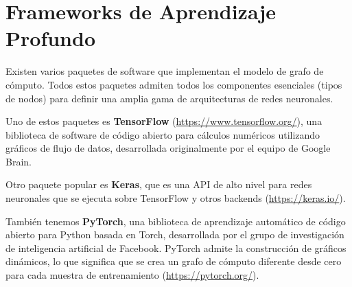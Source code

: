 
\section{Frameworks de Aprendizaje Profundo}
Existen varios paquetes de software que implementan el modelo de grafo de cómputo. Todos estos paquetes admiten todos los componentes esenciales (tipos de nodos) para definir una amplia gama de arquitecturas de redes neuronales.

Uno de estos paquetes es \textbf{TensorFlow} (\url{https://www.tensorflow.org/}), una biblioteca de software de código abierto para cálculos numéricos utilizando gráficos de flujo de datos, desarrollada originalmente por el equipo de Google Brain.

Otro paquete popular es \textbf{Keras}, que es una API de alto nivel para redes neuronales que se ejecuta sobre TensorFlow y otros backends (\url{https://keras.io/}).

También tenemos \textbf{PyTorch}, una biblioteca de aprendizaje automático de código abierto para Python basada en Torch, desarrollada por el grupo de investigación de inteligencia artificial de Facebook. PyTorch admite la construcción de gráficos dinámicos, lo que significa que se crea un grafo de cómputo diferente desde cero para cada muestra de entrenamiento (\url{https://pytorch.org/}).

